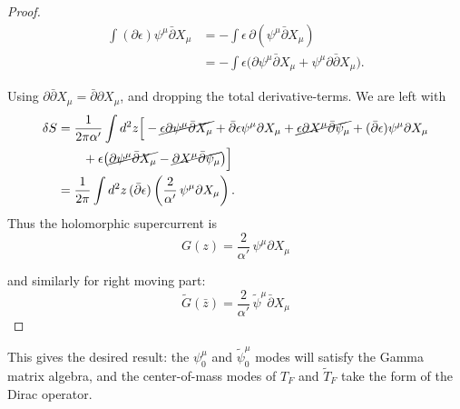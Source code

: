\begin{tcolorbox}[breakable]
\begin{proof}
		\begin{align}
			\int (\partial\epsilon)\psi^\mu\bar\partial X_\mu
			&= -\int \epsilon\,\partial(\psi^\mu\bar\partial X_\mu) \\
			&= -\int \epsilon\big(\partial\psi^\mu\bar\partial X_\mu + \psi^\mu \partial\bar\partial X_\mu\big).
		\end{align}
		
		Using $\partial\bar\partial X_\mu = \bar\partial\partial X_\mu$, and dropping the total derivative-terms. We are left with
		\begin{align*}
			\delta S
			&= \frac{1}{2\pi\alpha'}\int d^2z \Big[
			-\cancel{\epsilon\partial\psi^\mu\bar\partial X_\mu} + \bar\partial\epsilon\psi^\mu \partial X_\mu+\cancel{\epsilon\partial X^\mu\bar\partial\psi_\mu}
			+ (\bar\partial\epsilon)\psi^\mu\partial X_\mu \\
			&\qquad + \epsilon\big(\cancel{\partial\psi^\mu\bar\partial X_\mu} - \cancel{\partial X^\mu\bar\partial\psi_\mu}\big)
			\Big]\\
			&= \frac{1}{2\pi}\int d^2z\,(\bar\partial \epsilon)\left(\frac{2}{\alpha'}\,\psi^\mu \partial X_\mu\right).
		\end{align*}
		Thus the holomorphic supercurrent is
		\begin{equation}
			\boxed{
				G(z)=\frac{2}{\alpha'}\,\psi^\mu \partial X_\mu
			}
		\end{equation}
		
		and similarly for right moving part:
		\begin{equation}
			\boxed{
				\tilde G(\bar z)=\frac{2}{\alpha'}\,\tilde\psi^\mu \bar\partial X_\mu
			}
		\end{equation}
\end{proof}
\end{tcolorbox}
This gives the desired result: the $\psi_{0}^{\mu}$ and $\tilde{\psi}_{0}^{\mu}$ modes will satisfy the Gamma matrix algebra, and the center-of-mass modes of $T_{F}$ and $\tilde{T}_{F}$ take the form of the Dirac operator. 

